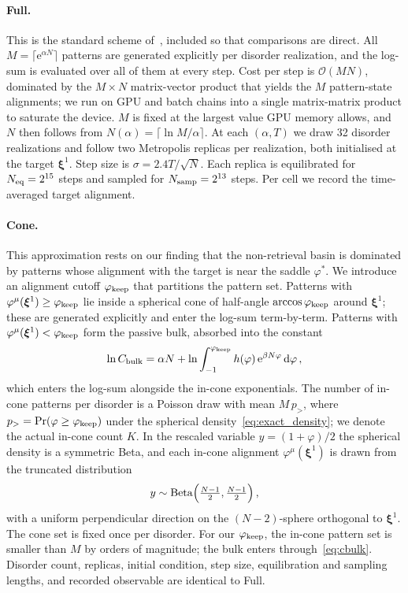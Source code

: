 \documentclass[letterpaper]{article} %
\newcommand{\bxi}{\boldsymbol{\xi}}
\newcommand{\e}{{\mathrm{e}}}
\newcommand{\dd}{{\mathrm{d}}}
\newcommand{\Bnet}{\beta}
\begin{document}
\paragraph{Full.} This is the standard scheme of~\citet{iclr2026mc}, included so that comparisons are direct. All $M = \lceil\e^{\alpha N}\rceil$ patterns are generated explicitly per disorder realization, and the log-sum is evaluated over all of them at every step. Cost per step is $\mathcal{O}(MN)$, dominated by the $M \times N$ matrix-vector product that yields the $M$ pattern-state alignments; we run on GPU and batch chains into a single matrix-matrix product to saturate the device. $M$ is fixed at the largest value GPU memory allows, and $N$ then follows from $N(\alpha) = \lceil \ln M / \alpha \rceil$. At each $(\alpha, T)$ we draw 32 disorder realizations and follow two Metropolis replicas per realization, both initialised at the target $\bxi^1$. Step size is $\sigma = 2.4 T / \sqrt N$. Each replica is equilibrated for $N_{\rm eq} = 2^{15}$ steps and sampled for $N_{\rm samp} = 2^{13}$ steps. Per cell we record the time-averaged target alignment.

\paragraph{Cone.}
This approximation rests on our finding that the non-retrieval basin is dominated by patterns whose alignment with the target is near the saddle $\varphi^*$. We introduce an alignment cutoff $\varphi_{\rm keep}$ that partitions the pattern set. Patterns with $\varphi^\mu(\bxi^1) \geq \varphi_{\rm keep}$ lie inside a spherical cone of half-angle $\arccos \varphi_{\rm keep}$ around $\bxi^1$; these are generated explicitly and enter the log-sum term-by-term. Patterns with $\varphi^\mu(\bxi^1) < \varphi_{\rm keep}$ form the passive bulk, absorbed into the constant
\begin{equation}
    \ln C_{\rm bulk} = \alpha N + \ln\int_{-1}^{\varphi_{\rm keep}} h(\varphi)\,\e^{\Bnet N \varphi}\,\dd\varphi\,,
    \label{eq:cbulk}
\end{equation}
which enters the log-sum alongside the in-cone exponentials. The number of in-cone patterns per disorder is a Poisson draw with mean $M\,p_{>}$, where $p_{>} = \Pr(\varphi \geq \varphi_{\rm keep})$ under the spherical density~\eqref{eq:exact_density}; we denote the actual in-cone count $K$. In the rescaled variable $y = (1 + \varphi)/2$ the spherical density is a symmetric Beta, and each in-cone alignment $\varphi^\mu(\bxi^1)$ is drawn from the truncated distribution
\begin{equation}
    y \sim \mathrm{Beta} \Bigl(\tfrac{N-1}{2}, \tfrac{N-1}{2}\Bigr)\,,
    \label{eq:beta-tail}
\end{equation}
with a uniform perpendicular direction on the $(N{-}2)$-sphere orthogonal to $\bxi^1$. The cone set is fixed once per disorder. For our $\varphi_{\rm keep}$, the in-cone pattern set is smaller than $M$ by orders of magnitude; the bulk enters through~\eqref{eq:cbulk}. Disorder count, replicas, initial condition, step size, equilibration and sampling lengths, and recorded observable are identical to Full. 
\end{document}
